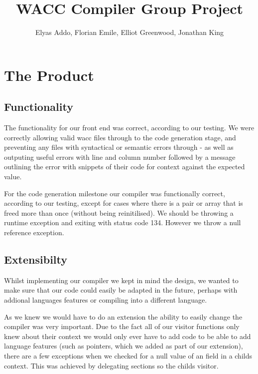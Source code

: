 \documentclass[11pt,a4paper]{article}
\begin{document}
\title{WACC Compiler Group Project}
\author{Elyas Addo, Florian Emile, Elliot Greenwood, Jonathan King}

\maketitle

\section{The Product}
\label{sec:The Product}

\subsection{Functionality}
\label{sub:Functionality}

The functionality for our front end was correct, according to our testing. We were correctly allowing valid wacc files through to the code generation stage, and preventing any files with syntactical or semantic errors through - as well as outputing useful errors with line and column number followed by a message outlining the error with snippets of their code for context against the expected value.

For the code generation milestone our compiler was functionally correct, according to our testing, except for cases where there is a pair or array that is freed more than once (without being reinitilised). We should be throwing a runtime exception and exiting with status code 134. However we throw a null reference exception.

\subsection{Extensibilty}
\label{subs:Extensibilty}

Whilst implementing our compiler we kept in mind the design, we wanted to make sure that our code could easily be adapted in the future, perhaps with addional languages features or compiling into a different language.

As we knew we would have to do an extension the ability to easily change the compiler was very important. Due to the fact all of our visitor functions only knew about their context we would only ever have to add code to be able to add language features (such as pointers, which we added as part of our extension), there are a few exceptions when we checked for a null value of an field in a childs context. This was achieved by delegating sections so the childs visitor.
\end{document}
